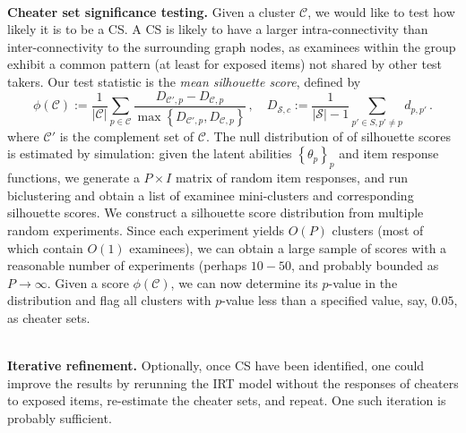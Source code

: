 \documentclass{article}
\newcommand{\cC}{\mathcal{C}}
\newcommand{\cS}{\mathcal{S}}
\begin{document}
{\mbox{}}\\
{\bf Cheater set significance testing.} Given a cluster $\cC$, we would like to test how likely it is to be a CS. A CS is likely to have a larger intra-connectivity than inter-connectivity to the surrounding graph nodes, as examinees within the group exhibit a common pattern (at least for exposed items) not shared by other test takers. Our test statistic is the {\it mean silhouette score}, defined by
\begin{equation}
	\phi(\cC) :=  \frac{1}{|\cC|} \sum_{p \in \cC}  \frac{D_{\cC',p}- D_{\cC,p}}{\max\left\{D_{\cC',p}, D_{\cC,p} \right\}}\,,\quad
	D_{\cS, c} := \frac{1}{|\cS|-1} \sum_{p' \in S, p' \not = p} d_{p,p'}\,.
	\label{sil}
\end{equation}
where $\cC'$ is the complement set of $\cC$. The null distribution of of silhouette scores is estimated by simulation: given the latent abilities $\left\{\theta_p\right\}_p$ and item response functions, we generate a $P \times I$ matrix of random item responses, and run biclustering and obtain a list of examinee mini-clusters and corresponding silhouette scores. We construct a silhouette score distribution from multiple random experiments. Since each experiment yields $O(P)$ clusters (most of which contain $O(1)$ examinees), we can obtain a large sample of scores with a reasonable number of experiments (perhaps $10-50$, and probably bounded as $P \longrightarrow \infty$. Given a score $\phi(\cC)$, we can now determine its $p$-value in the distribution and flag all clusters with $p$-value less than a specified value, say, $0.05$, as cheater sets.

{\mbox{}}\\
{\bf Iterative refinement.} Optionally, once CS have been identified, one could improve the results by rerunning the IRT model without the responses of cheaters to exposed items, re-estimate the cheater sets, and repeat. One such iteration is probably sufficient.
\end{document}
